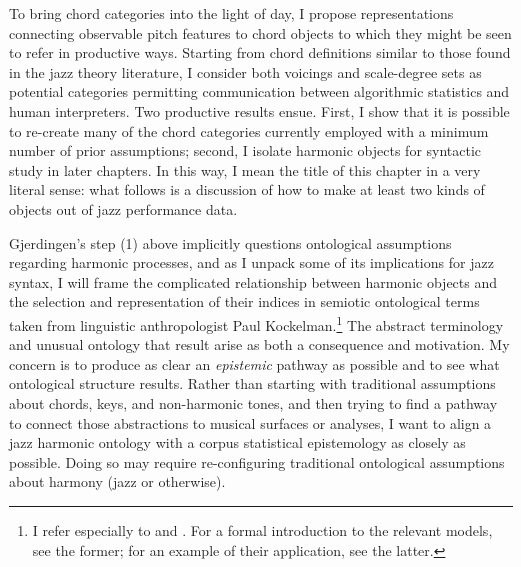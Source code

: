 To bring chord categories into the light of day, I propose representations connecting observable pitch features to chord objects to which they might be seen to refer in productive ways.  Starting from chord definitions similar to those found in the jazz theory literature, I consider both voicings and scale-degree sets as potential categories permitting communication between algorithmic statistics and human interpreters.  Two productive results ensue.  First, I show that it is possible to re-create many of the chord categories currently employed with a minimum number of prior assumptions; second, I isolate harmonic objects for syntactic study in later chapters.  In this way, I mean the title of this chapter in a very literal sense: what follows is a discussion of how to make at least two kinds of objects out of jazz performance data.

Gjerdingen's step (1) above implicitly questions ontological assumptions regarding harmonic processes, and as I unpack some of its implications for jazz syntax, I will frame the complicated relationship between harmonic objects and the selection and representation of their indices in semiotic ontological terms taken from linguistic anthropologist Paul Kockelman.\footnote{I refer especially to \cite{kockelman2013} and \cite{kockelman2013anthropology}.  For a formal introduction to the relevant models, see the former; for an example of their application, see the latter.} The abstract terminology and unusual ontology that result arise as both a consequence and motivation.  My concern is to produce as clear an \emph{epistemic} pathway as possible and to see what ontological structure results.  Rather than starting with traditional assumptions about chords, keys, and non-harmonic tones, and then trying to find a pathway to connect those abstractions to musical surfaces or analyses, I want to align a jazz harmonic ontology with a corpus statistical epistemology as closely as possible.  Doing so may require re-configuring traditional ontological assumptions about harmony (jazz or otherwise).


